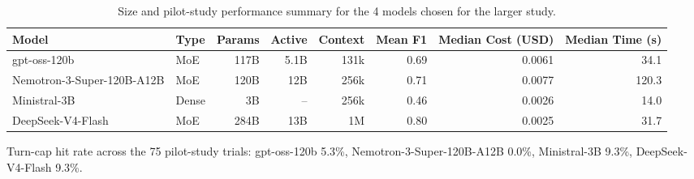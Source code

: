 
\begin{table}[htbp]
\centering
\caption{Size and pilot-study performance summary for the 4 models chosen for the larger study.}
\label{tab:study1-model-panel-specs}
\begin{tabular}{@{}l l r r r r r r@{}}
\toprule
Model & Type & Params & Active & Context & Mean F1 & Median Cost (USD) & Median Time (s) \\
\midrule
gpt-oss-120b               & MoE   & 117B & 5.1B & 131k & 0.69 & 0.0061 & 34.1  \\
Nemotron-3-Super-120B-A12B & MoE   & 120B & 12B  & 256k & 0.71 & 0.0077 & 120.3 \\
Ministral-3B               & Dense & 3B   & --   & 256k & 0.46 & 0.0026 & 14.0  \\
DeepSeek-V4-Flash          & MoE   & 284B & 13B  & 1M   & 0.80 & 0.0025 & 31.7  \\
\bottomrule
\end{tabular}

\vspace{4pt}
\footnotesize
Turn-cap hit rate across the 75 pilot-study trials: gpt-oss-120b 5.3\%, Nemotron-3-Super-120B-A12B 0.0\%, Ministral-3B 9.3\%, DeepSeek-V4-Flash 9.3\%.
\end{table}
